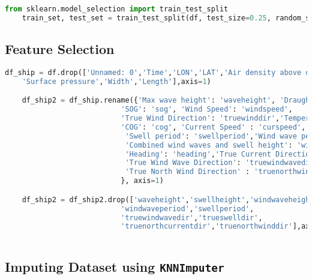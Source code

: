 \begin{lstlisting}[language=Python]
    from sklearn.model_selection import train_test_split
    train_set, test_set = train_test_split(df, test_size=0.25, random_state=42)

\end{lstlisting}

\subsection*{Feature Selection}

\begin{lstlisting}[language=Python]
    df_ship = df.drop(['Unnamed: 0','Time','LON','LAT','Air density above oceans',
    'Surface pressure','Width','Length'],axis=1)

    df_ship2 = df_ship.rename({'Max wave height': 'waveheight', 'Draught': 'draught',
                           'SOG': 'sog', 'Wind Speed': 'windspeed', 
                           'True Wind Direction': 'truewinddir','Temperature above oceans' : 'oceantemperature',
                           'COG': 'cog', 'Current Speed' : 'curspeed','True Wave Direction' : 'truewavedir',
                            'Swell period': 'swellperiod','Wind wave period': 'windwaveperiod','Sea surface temperature': 'surftemp',
                            'Combined wind waves and swell height': 'windwaveswellheight','Swell height': 'swellheight','Wind wave height': 'windwaveheight',
                            'Heading': 'heading','True Current Direction': 'truecurrentdir','True Swell Direction': 'trueswelldir',
                            'True Wind Wave Direction': 'truewindwavedir','Wave period': 'waveperiod',
                            'True North Wind Direction' : 'truenorthwinddir' , 'True North Current Direction' : 'truenorthcurrentdir'
                           }, axis=1) 

    df_ship2 = df_ship2.drop(['waveheight','swellheight','windwaveheight',
                           'windwaveperiod','swellperiod',
                           'truewindwavedir','trueswelldir',
                           'truenorthcurrentdir','truenorthwinddir'],axis=1)
   


\end{lstlisting}

\subsection*{Imputing Dataset using \texttt{KNNImputer}}


